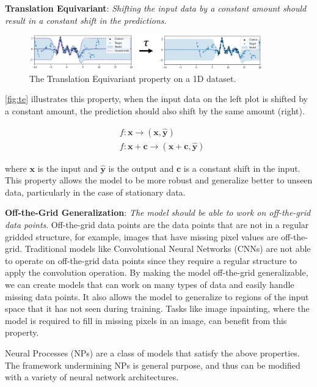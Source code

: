 \documentclass[../../main.tex]{subfiles}
\begin{document}
\textbf{Translation Equivariant}: \emph{Shifting the input data by a constant amount should result in a constant shift in the predictions}. 

\begin{figure}[H]
	\centering
	\includegraphics[width=0.9\textwidth]{./te.PNG}
	\caption{The Translation Equivariant property on a 1D dataset.}
	\label{fig:te}
\end{figure}


\autoref{fig:te} illustrates this property, when the input data on the left plot is shifted by a constant amount, the prediction should also shift by the same amount (right).

\begin{align}
	&f: \bm{x} \rightarrow (\bm{x}, \bm{\hat{y}}) \\
	&f: \bm{x} + \bm{c} \rightarrow (\bm{x} + \bm{c}, \bm{\hat{y}})
\end{align}

where $\bm{x}$ is the input and $\bm{\hat{y}}$ is the output and $\bm{c}$ is a constant shift in the input. This property allows the model to be more robust and generalize better to unseen data, particularly in the case of stationary data.


\textbf{Off-the-Grid Generalization}: \emph{The model should be able to work on off-the-grid data points}. Off-the-grid data points are the data points that are not in a regular gridded structure, for example, images that have missing pixel values are off-the-grid. Traditional models like Convolutional Neural Networks (CNNs) are not able to operate on off-the-grid data points since they require a regular structure to apply the convolution operation. By making the model off-the-grid generalizable, we can create models that can work on many types of data and easily handle missing data points. It also allows the model to generalize to regions of the input space that it has not seen during training. Tasks like image inpainting, where the model is required to fill in missing pixels in an image, can benefit from this property.


Neural Processes (NPs) \parencite{garnelo2018neural} are a class of models that satisfy the above properties. The framework undermining NPs is general purpose, and thus can be modified with a variety of neural network architectures. 
\end{document}
